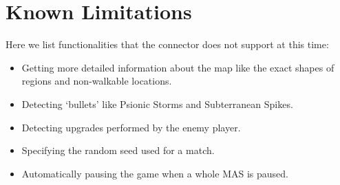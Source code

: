 \section{Known Limitations}
Here we list functionalities that the connector does not support at this time:
\begin{itemize}
 \item Getting more detailed information about the map like the exact shapes of regions and non-walkable locations.
 \item Detecting `bullets' like Psionic Storms and Subterranean Spikes.
 \item Detecting upgrades performed by the enemy player.
 \item Specifying the random seed used for a match.
 \item Automatically pausing the game when a whole MAS is paused.
\end{itemize}